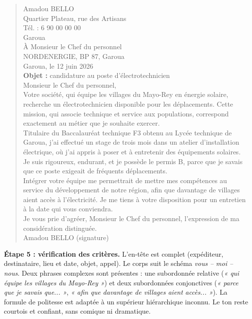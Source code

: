 \documentclass[11pt]{article}
\begin{document}
\begin{exoresolu}
\begin{quote}
Amadou BELLO\\
Quartier Plateau, rue des Artisans\\
Tél. : 6 90 00 00 00\\
Garoua\\[4pt]
\hspace*{8cm}À Monsieur le Chef du personnel\\
\hspace*{8cm}NORDENERGIE, BP 87, Garoua\\[4pt]
\hspace*{8cm}Garoua, le 12 juin 2026\\[4pt]
\textbf{Objet :} candidature au poste d'électrotechnicien\\[4pt]
Monsieur le Chef du personnel,\\[4pt]
Votre société, qui équipe les villages du Mayo-Rey en énergie solaire, recherche un électrotechnicien disponible pour les déplacements. Cette mission, qui associe technique et service aux populations, correspond exactement au métier que je souhaite exercer.\\[4pt]
Titulaire du Baccalauréat technique F3 obtenu au Lycée technique de Garoua, j'ai effectué un stage de trois mois dans un atelier d'installation électrique, où j'ai appris à poser et à entretenir des équipements solaires. Je suis rigoureux, endurant, et je possède le permis B, parce que je savais que ce poste exigeait de fréquents déplacements.\\[4pt]
Intégrer votre équipe me permettrait de mettre mes compétences au service du développement de notre région, afin que davantage de villages aient accès à l'électricité. Je me tiens à votre disposition pour un entretien à la date qui vous conviendra.\\[4pt]
Je vous prie d'agréer, Monsieur le Chef du personnel, l'expression de ma considération distinguée.\\[4pt]
\hspace*{8cm}Amadou BELLO (signature)
\end{quote}

\textbf{Étape 5 : vérification des critères.}
L'en-tête est complet (expéditeur, destinataire, lieu et date, objet, appel). Le corps suit le schéma \emph{vous -- moi -- nous}. Deux phrases complexes sont présentes : une subordonnée relative (\emph{« qui équipe les villages du Mayo-Rey »}) et deux subordonnées conjonctives (\emph{« parce que je savais que... »}, \emph{« afin que davantage de villages aient accès... »}). La formule de politesse est adaptée à un supérieur hiérarchique inconnu. Le ton reste courtois et confiant, sans comique ni dramatique.


\end{exoresolu}
\end{document}
